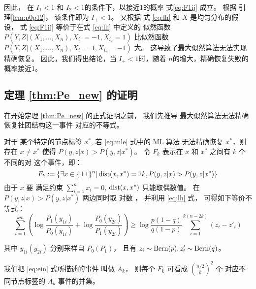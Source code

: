 因此， 在 $I_1<1$ 和 $I_2<1$的条件下，以接近1的概率 式\eqref{eq:F1ij} 成立。
根据 引理\ref{lem:p0p12}，
该条件即为 $I_+<1$。
又根据 式 \eqref{eq:lh} 和 $X$ 是均匀分布的假设，
式 \eqref{eq:F1ij} 等价于在式 \eqref{eq:lh} 中定义的 似然函数
$P(Y,Z|(X_1,\ldots,X_n),X_{i_1}=-1,X_{i_2}=1)$
比似然函数
$P(Y,Z|(X_1,\ldots,X_n),X_{i_1}=1,X_{i_2}=-1)$
大。
这导致了最大似然算法无法实现精确恢复。
因此，我们得出结论，当 $I_+<1$时，随着 $n$的增大，精确恢复失败的概率接近1。

\subsection{定理 \ref{thm:Pe_new} 的证明}

在开始定理 \ref{thm:Pe_new}  的正式证明之前，
我们先推导
最大似然算法无法精确恢复社团结构这一事件
对应的不等式。

对于
某个特定的节点标签
$x^*$,
若
\eqref{eq:mle} 式中的 ML 算法
无法精确恢复 
$x^*$，则
存在 $x\neq x^*$ 使得 $P(y,z|x) > P(y,z|x^*)$。
令 $F_k$ 表示在 $x$ 和 $x^*$ 之间有 $k$ 个不同的对
这个事件，即：
    \begin{equation}\label{eq:Fk}
    F_k:=\{\exists x \in \{\pm 1\}^n |
    \operatorname{dist}(x, x^*)=2k,
    P(y,z|x) > 
    P(y,z|x^*) \}
    \end{equation}
    由于
    $x$ 要 满足约束
    $\sum_{i=1}^n x_i=0$,
    $\operatorname{dist}(x, x^*)$
    只能取偶数值。
    在
    $P(y,z|x) > P(y,z|x^*)$
    两边同时取
    对数
    ， 并利用
    \eqref{eq:lh} 式，
    可得如下等价不等式：
    \begin{equation}\label{eq:ein}
    \sum_{i=1}^{km}
    \left(\log \frac{P_1(y_{1i})}
    {P_0(y_{1i})}
    + \log \frac{P_0(y_{2i})}
    {P_1(y_{2i})}
    \right)
    \geq \log \frac{p(1-q)}{q(1-p)} \sum_{i=1}^{k(n-2k)}(z_{i} - z'_{i})
    \end{equation}
    
    其中 $y_{1i}(y_{2i})$ 分别采样自
    $P_0(P_1)$，
    且有 $z_{i} \sim \operatorname{Bern}(p), z'_{i} \sim \operatorname{Bern}(q)$。
    
    我们把 \eqref{eq:ein} 式所描述的事件
    叫做 $A_k$，
    则每个 $F_k$ 
    可看成
     $\binom{n/2}{k}^2$ 个
    对应不同节点标签的
    $A_k$ 事件的并集。
    
